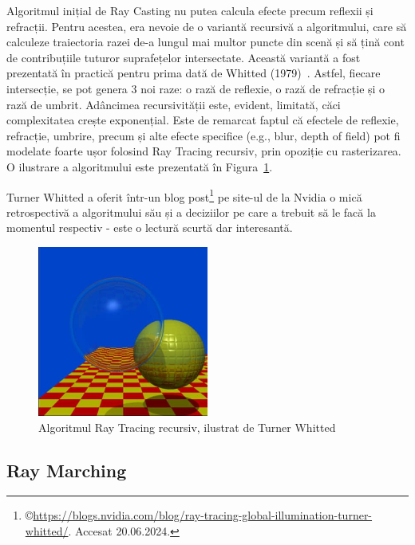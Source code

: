 \documentclass[12pt,a4paper]{report}
\numberwithin{equation}{section} %
\begin{document}
Algoritmul inițial de Ray Casting nu putea calcula efecte precum reflexii și refracții.
Pentru acestea, era nevoie de o variantă recursivă a algoritmului, care să calculeze
traiectoria razei de-a lungul mai multor puncte din scenă și să țină cont de
contribuțiile tuturor suprafețelor intersectate. Această variantă a fost prezentată
în practică pentru prima dată de Whitted (1979)~\cite{Whitted}. Astfel, fiecare
intersecție, se pot genera 3 noi raze: o rază de reflexie, o rază de refracție și
o rază de umbrit. Adâncimea recursivității este, evident, limitată, căci complexitatea
crește exponențial. Este de remarcat faptul că efectele de reflexie, refracție, umbrire,
precum și alte efecte specifice (e.g., blur, depth of field) pot fi modelate foarte
ușor folosind Ray Tracing recursiv, prin opoziție cu rasterizarea. O ilustrare
a algoritmului este prezentată în Figura~\ref{fig:whitted}.

Turner Whitted a oferit
într-un blog post\footnote{\label{fn:whitted}\copyright\url{https://blogs.nvidia.com/blog/ray-tracing-global-illumination-turner-whitted/}. Accesat 20.06.2024.}
pe site-ul de la Nvidia o mică retrospectivă a algoritmului său și a deciziilor
pe care a trebuit să le facă la momentul respectiv - este o lectură scurtă dar
interesantă.

\begin{figure}[ht]
	\centering
	\includegraphics[width=0.5\textwidth]{pics/whitted.jpg}
	\caption{Algoritmul Ray Tracing recursiv, ilustrat de Turner Whitted\protect{}}
	\label{fig:whitted}
\end{figure}

\subsection*{Ray Marching}
\end{document}
